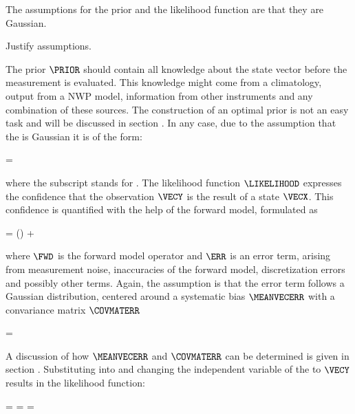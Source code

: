     The assumptions for the prior {\PDF} and the likelihood function
    are that they are Gaussian.

    Justify assumptions.

    The prior $\PRIOR$ should contain all knowledge about the state vector
    before the measurement is evaluated. This knowledge might come from
    a climatology, output from a NWP model, information from other instruments
    and any combination of these sources. The construction of an optimal prior
    is not an easy task and will be discussed in section
    . In any case, due to the assumption that the
    {\PDF} is Gaussian it is of the form:

    \startformula
        \PRIOR = \GAUSS{\VECX}{\MEANVECA}{\COVMATA} \EQCOMMA
    \stopformula

    where the subscript  stands for .  The likelihood
    function $\LIKELIHOOD$ expresses the confidence that the observation
    $\VECY$ is the result of a state $\VECX$. This confidence is quantified
    with the help of the forward model, formulated as

    \startformula
        \VECY = \FWD(\VECX) + \ERR \EQCOMMA
    \stopformula

    where $\FWD$ is the forward model operator and $\ERR$ is an error term,
    arising from measurement noise, inaccuracies of the forward model,
    discretization errors and possibly other terms. Again, the assumption is
    that the error term follows a Gaussian distribution, centered around
    a systematic bias $\MEANVECERR$ with a convariance matrix $\COVMATERR$

    \startformula
        \PROB{\ERR} = \GAUSS{\ERR}{\MEANVECERR}{\COVMATERR} \EQSTOP
    \stopformula

    A discussion of how $\MEANVECERR$ and $\COVMATERR$ can be determined is
    given in section . Substituting 
    into  and changing the independent variable of
    the {\PDF} to $\VECY$ results in the likelihood function:
    
    \placesubformula
    \startformula
    \startalign[n=3,align={right,middle,left}]
        \NC \PROB{\VECY - \FWD(\VECX)} = \NC
            \GAUSS{\VECY - \FWD(\VECX)}{\MEANVECERR}{\COVMATERR} \NC \NR
        \NC = \NC \GAUSS{\VECY}{\FWD(\VECX)+\MEANVECERR}{\COVMATERR} \NC
            = \LIKELIHOOD \EQSTOP {}
    \stopalign
    \stopformula


